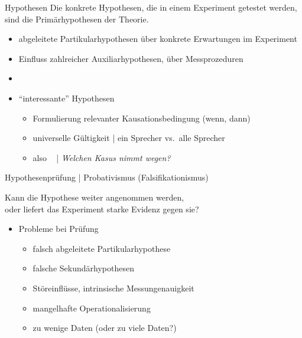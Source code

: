 \begin{frame}
  {Hypothesen}
  Die konkrete Hypothesen, die in einem Experiment getestet werden,\\
  sind  die Primärhypothesen der Theorie.
  \Zeile
  \begin{itemize}[<+->]  
    \item \alert{abgeleitete Partikularhypothesen} über konkrete Erwartungen im Experiment
    \item Einfluss zahlreicher \alert{Auxiliarhypothesen}, \zB über Messprozeduren
    \item[ ] 
    \Zeile
    \item "`interessante"' Hypothesen
      \begin{itemize}[<+->]
        \item Formulierung relevanter \alert{Kausationsbedingung} (wenn, dann)
        \item \alert{universelle Gültigkeit} | ein Sprecher vs.\ alle Sprecher
        \item also \zB\  | \textit{Welchen Kasus nimmt wegen?}
      \end{itemize}
      \Halbzeile
  \end{itemize}
\end{frame}

\begin{frame}
  {Hypothesenprüfung | Probativismus (Falsifikationismus)}
  \begin{center}
    \alert{Kann die Hypothese weiter angenommen werden,\\
    oder liefert das Experiment starke Evidenz gegen sie?}
  \end{center}
  \Zeile
  \begin{itemize}[<+->]
    \item Probleme bei Prüfung
      \Viertelzeile
      \begin{itemize}[<+->]
        \item falsch abgeleitete Partikularhypothese
        \item falsche Sekundärhypothesen
	\item Störeinflüsse, intrinsische Messungenauigkeit
        \item mangelhafte \alert{Operationalisierung}
	\item zu wenige Daten (oder zu viele Daten?)
      \end{itemize}
  \end{itemize}
\end{frame}


